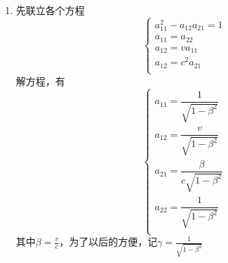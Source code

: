 \documentclass[UTF8]{ctexart}
\numberwithin{equation}{section}
\begin{document}
\begin{enumerate}
    \item 先联立各个方程
    \[
    \begin{cases}
        a_{11}^2 - a_{12}a_{21} = 1\\
        a_{11} = a_{22}\\
        a_{12} = v a_{11}\\
        a_{12} = c^2 a_{21}\\
    \end{cases}
    \]
    解方程，有
    \[
    \begin{cases}
        a_{11} = \dfrac{1}{\sqrt{1-\beta^2}}\\
        a_{12} = \dfrac{v}{\sqrt{1-\beta^2}}\\
        a_{21} = \dfrac{\beta}{c\sqrt{1-\beta^2}}\\
        a_{22} = \dfrac{1}{\sqrt{1-\beta^2}}\\
    \end{cases}
    \]
    其中$\displaystyle \beta = \frac{v}{c}$，为了以后的方便，记$\displaystyle \gamma = \frac{1}{\sqrt{1-\beta^2}}$
\end{enumerate}
\end{document}
